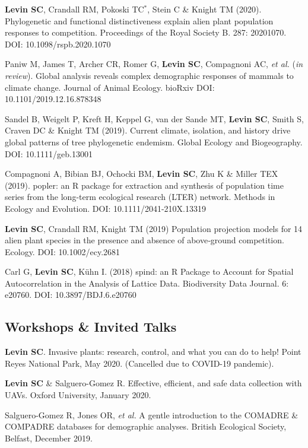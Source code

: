 \documentclass[11pt,]{article}
\begin{document}
\textbf{Levin SC}, Crandall RM, Pokoski TC\(^\ast\), Stein C \& Knight
TM (2020). Phylogenetic and functional distinctiveness explain alien
plant population responses to competition. Proceedings of the Royal
Society B. 287: 20201070. DOI: 10.1098/rspb.2020.1070

Paniw M, James T, Archer CR, Romer G, \textbf{Levin SC}, Compagnoni AC,
\emph{et al.} (\emph{in review}). Global analysis reveals complex
demographic responses of mammals to climate change. Journal of Animal
Ecology. bioRxiv DOI: 10.1101/2019.12.16.878348

Sandel B, Weigelt P, Kreft H, Keppel G, van der Sande MT, \textbf{Levin
SC}, Smith S, Craven DC \& Knight TM (2019). Current climate, isolation,
and history drive global patterns of tree phylogenetic endemism. Global
Ecology and Biogeography. DOI: 10.1111/geb.13001

Compagnoni A, Bibian BJ, Ochocki BM, \textbf{Levin SC}, Zhu K \& Miller
TEX (2019). popler: an R package for extraction and synthesis of
population time series from the long-term ecological research (LTER)
network. Methods in Ecology and Evolution. DOI: 10.1111/2041-210X.13319

\textbf{Levin SC}, Crandall RM, Knight TM (2019) Population projection
models for 14 alien plant species in the presence and absence of
above‐ground competition. Ecology. DOI: 10.1002/ecy.2681

Carl G, \textbf{Levin SC}, Kühn I. (2018) spind: an R Package to Account
for Spatial Autocorrelation in the Analysis of Lattice Data.
Biodiversity Data Journal. 6: e20760. DOI: 10.3897/BDJ.6.e20760

\hypertarget{workshops-invited-talks}{%
\subsection{Workshops \& Invited Talks}\label{workshops-invited-talks}}

\textbf{Levin SC}. Invasive plants: research, control, and what you can
do to help! Point Reyes National Park, May 2020. (Cancelled due to
COVID-19 pandemic).

\textbf{Levin SC} \& Salguero-Gomez R. Effective, efficient, and safe
data collection with UAVs. Oxford University, January 2020.

Salguero-Gomez R, Jones OR, \emph{et al.} A gentle introduction to the
COMADRE \& COMPADRE databases for demographic analyses. British
Ecological Society, Belfast, December 2019.
\end{document}
